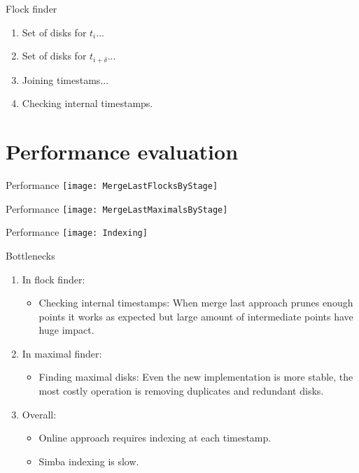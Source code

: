 \documentclass{beamer}
\theoremstyle{definition}
\begin{document}
\begin{frame}{Flock finder}
    \begin{enumerate}
        \item Set of disks for $t_i$...
        \item Set of disks for $t_{i+\delta}$...
        \item Joining timestams...
        \item Checking internal timestamps.
    \end{enumerate}
\end{frame}

\section{Performance evaluation}

\begin{frame}{Performance}
    \centering
    \texttt{[image: MergeLastFlocksByStage]}
\end{frame}

\begin{frame}{Performance}
    \centering
    \texttt{[image: MergeLastMaximalsByStage]}
\end{frame}

\begin{frame}{Performance}
    \centering
    \texttt{[image: Indexing]}
\end{frame}

\begin{frame}{Bottlenecks}
    \begin{enumerate}
        \item In flock finder:
            \begin{itemize}
                \item Checking internal timestamps: When merge last approach prunes enough points it works as expected but large amount of intermediate points have huge impact. 
            \end{itemize}
        \item In maximal finder:
            \begin{itemize}
                \item Finding maximal disks: Even the new implementation is more stable, the most costly operation is removing duplicates and redundant disks.
            \end{itemize}
        \item Overall:
            \begin{itemize}
             \item Online approach requires indexing at each timestamp.
             \item Simba indexing is slow.
            \end{itemize}
    \end{enumerate}
\end{frame}
\end{document}
